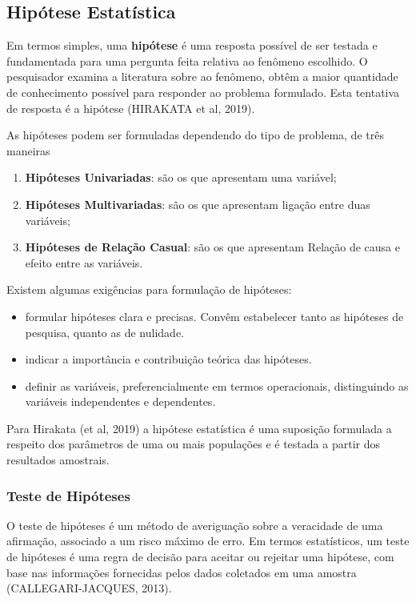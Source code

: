 \subsection{Hipótese Estatística}

Em termos simples, uma \textbf{hipótese} é uma resposta possível de ser testada e fundamentada para uma pergunta feita relativa ao fenômeno escolhido. O pesquisador examina a literatura sobre ao fenômeno, obtêm a maior quantidade de conhecimento possível para responder ao problema formulado. Esta tentativa de resposta é a hipótese (HIRAKATA et al, 2019).\vskip0.3cm    

As hipóteses podem ser formuladas dependendo do tipo de problema, de três maneiras

\begin{enumerate}
\item \textbf{Hipóteses Univariadas}: são os que apresentam uma variável;  
\item \textbf{Hipóteses Multivariadas}: são os que apresentam ligação entre duas va\-ri\-á\-veis;
\item \textbf{Hipóteses de Relação Casual}: são os que apresentam Relação de causa e efeito entre as variáveis.
\end{enumerate}

Existem algumas exigências para formulação de hipóteses:

\begin{itemize}
\item formular hipóteses clara e precisas. Convêm estabelecer tanto as hipóteses de pesquisa, quanto as de nulidade.  
\item indicar a importância e contribuição teórica das hipóteses.
\item definir as variáveis, preferencialmente em termos operacionais, distinguindo as variáveis independentes e dependentes. 
\end{itemize}

Para Hirakata (et al, 2019) a hipótese estatística é uma suposição formulada a respeito dos parâmetros de uma ou mais populações e é testada a partir dos resultados amostrais. 

\subsubsection{Teste de Hipóteses}

O teste de hipóteses é um método de averiguação sobre a veracidade de uma afirmação, associado a um risco máximo de erro. Em termos estatísticos, um teste de hipóteses é uma regra de decisão para aceitar ou rejeitar uma hipótese, com base nas informações fornecidas pelos dados coletados em uma amostra (CALLEGARI-JACQUES, 2013).\vskip0.3cm

